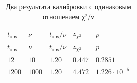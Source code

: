 \documentclass[
  russian,
  11pt,
  a4paper,
  open=any]{scrbook}
\begin{document}
\begin{longtable}[]{@{}
  >{\raggedleft\arraybackslash}p{}
  >{\raggedleft\arraybackslash}p{}
  >{\raggedleft\arraybackslash}p{}
  >{\raggedleft\arraybackslash}p{}
  >{\raggedleft\arraybackslash}p{}@{}}
\caption{Два результата калибровки с одинаковым отношением
χ²/ν}\label{tbl-chi2-ratio-examples}\tabularnewline
\toprule\noalign{}
\begin{minipage}[b]{\linewidth}\raggedleft
\(t_{\mathrm{obs}}\)
\end{minipage} & \begin{minipage}[b]{\linewidth}\raggedleft
\(\nu\)
\end{minipage} & \begin{minipage}[b]{\linewidth}\raggedleft
\(t_{\mathrm{obs}}/\nu\)
\end{minipage} & \begin{minipage}[b]{\linewidth}\raggedleft
\(z_{\chi^2}\)
\end{minipage} & \begin{minipage}[b]{\linewidth}\raggedleft
\(p\)
\end{minipage} \\
\midrule\noalign{}
\endfirsthead
\toprule\noalign{}
\begin{minipage}[b]{\linewidth}\raggedleft
\(t_{\mathrm{obs}}\)
\end{minipage} & \begin{minipage}[b]{\linewidth}\raggedleft
\(\nu\)
\end{minipage} & \begin{minipage}[b]{\linewidth}\raggedleft
\(t_{\mathrm{obs}}/\nu\)
\end{minipage} & \begin{minipage}[b]{\linewidth}\raggedleft
\(z_{\chi^2}\)
\end{minipage} & \begin{minipage}[b]{\linewidth}\raggedleft
\(p\)
\end{minipage} \\
\midrule\noalign{}
\endhead
\bottomrule\noalign{}
\endlastfoot
\(12\) & \(10\) & \(1.20\) & \(0.447\) & \(0.2851\) \\
\(1200\) & \(1000\) & \(1.20\) & \(4.472\) & \(1.226\cdot10^{-5}\) \\
\end{longtable}
\end{document}
